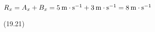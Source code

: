 {\begin{mdframed}[linewidth=4, leftmargin=40, rightmargin=40]
\begin{exercise}
\begin{enumerate}[noitemsep, label=\textbf{Step} \textbf{\arabic*}. ]
{\begin{equation}
      \end{equation}
    }{%
    \setlength{\mymathboxwidth}{\columnwidth}
      \addtolength{\mymathboxwidth}{-48pt}
    \par\vspace{12pt}\noindent\begin{minipage}{\columnwidth}
    \parbox[t]{\mymathboxwidth}{\large\begin{math}
    {R}_{x}={A}_{x}+{B}_{x}=5\phantom{\rule{2pt}{0ex}}\mathrm{m}\ensuremath{\cdot}{\mathrm{s}}^{-1}+3\phantom{\rule{2pt}{0ex}}\mathrm{m}\ensuremath{\cdot}{\mathrm{s}}^{-1}=8\phantom{\rule{2pt}{0ex}}\mathrm{m}\ensuremath{\cdot}{\mathrm{s}}^{-1}\end{math}}\hfill
    \parbox[t]{48pt}{\raggedleft 
    (19.21)}
    \end{minipage}\vspace{12pt}\par
    }%
    

\end{enumerate}
\end{exercise}
\end{mdframed}}
